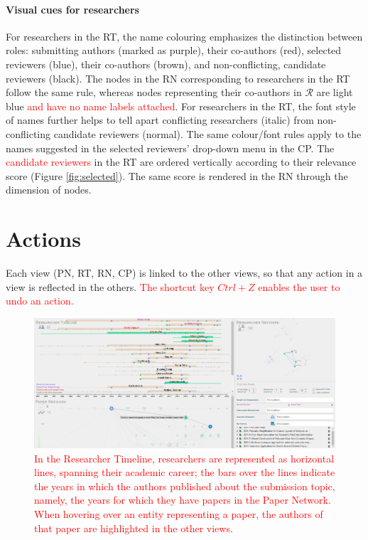 \paragraph*{Visual cues for researchers} 
For researchers in the RT, the name colouring emphasizes the distinction between roles: submitting authors (marked as purple), their co-authors (red), selected reviewers (blue), their co-authors (brown), and non-conflicting, candidate reviewers (black). The nodes in the RN corresponding to researchers in the RT follow the same rule, whereas nodes representing their co-authors in $\mathcal{R}$ are light blue \textcolor{red}{and have no name labels attached}.   
For researchers in the RT, the font style of names further helps to tell apart conflicting researchers (italic) from non-conflicting candidate reviewers (normal). The same colour/font rules apply to the names suggested in the selected reviewers' drop-down menu in the CP.
The \textcolor{red}{candidate reviewers} in the RT are ordered vertically according to their relevance score (Figure \ref{fig:selected}). The same score is rendered in the RN through the dimension of nodes.  

\section{Actions}
\label{subsec:actions}

Each view (PN, RT, RN, CP) is linked to the other views, so that any action in a view is reflected in the others. \textcolor{red}{The shortcut key $Ctrl+Z$ enables the user to undo an action.}

\begin{figure}[!t]
    \centering
    \includegraphics[width=\textwidth]{fig/timeline_paperhover.png}
    \caption{\textcolor{red}{In the Researcher Timeline, researchers are represented as horizontal lines, spanning their academic career; the bars over the lines indicate the years in which the authors published about the submission topic, namely, the years for which they have papers in the Paper Network. When hovering over an entity representing a paper, the authors of that paper are highlighted in the other views.}}
    \label{fig:overpaper}
\end{figure}

